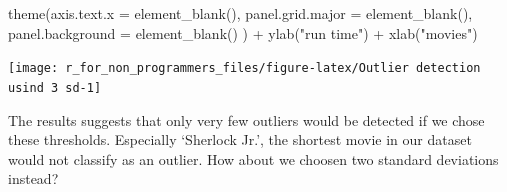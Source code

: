 \documentclass[
]{book}
\newenvironment{Shaded}{\begin{snugshade}}{\end{snugshade}}
\newcommand{\AttributeTok}[1]{\textcolor[rgb]{0.77,0.63,0.00}{#1}}
\newcommand{\FunctionTok}[1]{\textcolor[rgb]{0.00,0.00,0.00}{#1}}
\newcommand{\NormalTok}[1]{#1}
\newcommand{\SpecialCharTok}[1]{\textcolor[rgb]{0.00,0.00,0.00}{#1}}
\newcommand{\StringTok}[1]{\textcolor[rgb]{0.31,0.60,0.02}{#1}}
\begin{document}
\begin{Shaded}
\begin{Highlighting}[]
  \FunctionTok{theme}\NormalTok{(}\AttributeTok{axis.text.x =} \FunctionTok{element\_blank}\NormalTok{(),    }
        \AttributeTok{panel.grid.major =} \FunctionTok{element\_blank}\NormalTok{(),}
        \AttributeTok{panel.background =} \FunctionTok{element\_blank}\NormalTok{()}
\NormalTok{        ) }\SpecialCharTok{+}
  \FunctionTok{ylab}\NormalTok{(}\StringTok{"run time"}\NormalTok{) }\SpecialCharTok{+}
  \FunctionTok{xlab}\NormalTok{(}\StringTok{"movies"}\NormalTok{)}
\end{Highlighting}
\end{Shaded}

\begin{center}\texttt{[image: r\_for\_non\_programmers\_files/figure-latex/Outlier detection usind 3 sd-1]} \end{center}

The results suggests that only very few outliers would be detected if we chose these thresholds. Especially `Sherlock Jr.', the shortest movie in our dataset would not classify as an outlier. How about we choosen two standard deviations instead?
\end{document}
